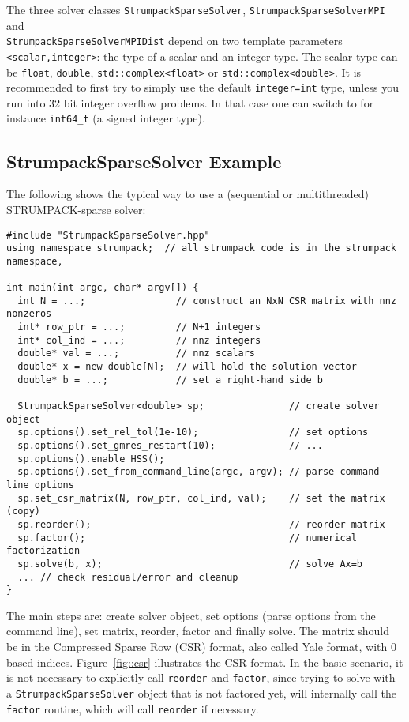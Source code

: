 \documentclass{article}
\begin{document}
The three solver classes \lstinline[style=C]!StrumpackSparseSolver!,
\lstinline[style=C]!StrumpackSparseSolverMPI! and\\
\lstinline[style=C]!StrumpackSparseSolverMPIDist! depend on two
template parameters \lstinline[style=C]!<scalar,integer>!: the type of
a scalar and an integer type. The scalar type can be
\lstinline[style=C]!float!, \lstinline[style=C]!double!,
\lstinline[style=C]!std::complex<float>! or
\lstinline[style=C]!std::complex<double>!. It is recommended to first
try to simply use the default \lstinline[style=C]!integer=int! type,
unless you run into 32 bit integer overflow problems. In that case one
can switch to for instance \lstinline[style=C]!int64_t! (a signed
integer type).

\subsection{StrumpackSparseSolver Example}
The following shows the typical way to use a (sequential or
multithreaded) STRUMPACK-sparse solver:
\begin{lstlisting}[style=C]
#include "StrumpackSparseSolver.hpp"
using namespace strumpack;  // all strumpack code is in the strumpack namespace,

int main(int argc, char* argv[]) {
  int N = ...;                // construct an NxN CSR matrix with nnz nonzeros
  int* row_ptr = ...;         // N+1 integers
  int* col_ind = ...;         // nnz integers
  double* val = ...;          // nnz scalars
  double* x = new double[N];  // will hold the solution vector
  double* b = ...;            // set a right-hand side b

  StrumpackSparseSolver<double> sp;               // create solver object
  sp.options().set_rel_tol(1e-10);                // set options
  sp.options().set_gmres_restart(10);             // ...
  sp.options().enable_HSS();
  sp.options().set_from_command_line(argc, argv); // parse command line options
  sp.set_csr_matrix(N, row_ptr, col_ind, val);    // set the matrix (copy)
  sp.reorder();                                   // reorder matrix
  sp.factor();                                    // numerical factorization
  sp.solve(b, x);                                 // solve Ax=b
  ... // check residual/error and cleanup
}
\end{lstlisting}
The main steps are: create solver object, set options (parse options
from the command line), set matrix, reorder, factor and finally
solve. The matrix should be in the Compressed Sparse Row (CSR) format,
also called Yale format, with $0$ based indices. Figure~\ref{fig::csr}
illustrates the CSR format. In the basic scenario, it is not necessary
to explicitly call \lstinline[style=C]!reorder!  and
\lstinline[style=C]!factor!, since trying to solve with a
\lstinline[style=C]!StrumpackSparseSolver! object that is not factored
yet, will internally call the \lstinline[style=C]!factor! routine,
which will call \lstinline[style=C]!reorder! if necessary.
\end{document}
